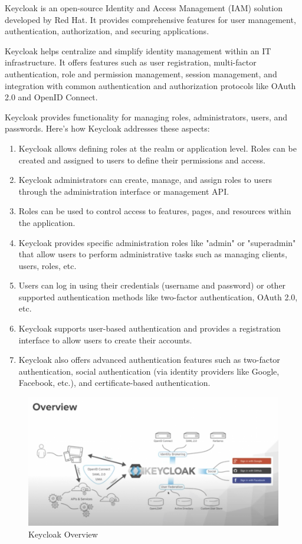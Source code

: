 Keycloak is an open-source Identity and Access Management (IAM) solution developed by Red Hat. It provides comprehensive features for user management, authentication, authorization, and securing applications.

Keycloak helps centralize and simplify identity management within an IT infrastructure. It offers features such as user registration, multi-factor authentication, role and permission management, session management, and integration with common authentication and authorization protocols like OAuth 2.0 and OpenID Connect.

Keycloak provides functionality for managing roles, administrators, users, and passwords. Here's how Keycloak addresses these aspects:

\cite{keycloak}

\begin{enumerate}
\item Keycloak allows defining roles at the realm or application level. Roles can be created and assigned to users to define their permissions and access.
\item Keycloak administrators can create, manage, and assign roles to users through the administration interface or management API.
\item Roles can be used to control access to features, pages, and resources within the application.
\item Keycloak provides specific administration roles like "admin" or "superadmin" that allow users to perform administrative tasks such as managing clients, users, roles, etc.
\item Users can log in using their credentials (username and password) or other supported authentication methods like two-factor authentication, OAuth 2.0, etc.
\item Keycloak supports user-based authentication and provides a registration interface to allow users to create their accounts.
\item Keycloak also offers advanced authentication features such as two-factor authentication, social authentication (via identity providers like Google, Facebook, etc.), and certificate-based authentication.
\end{enumerate}

\begin{figure}[H]
\centering
\includegraphics[width=\linewidth]{images/Keycloak-overview-screenshot.png}
\caption{Keycloak Overview}\label{fig:keycloak}
\end{figure}


